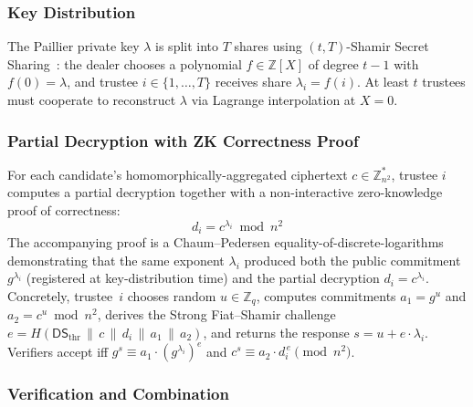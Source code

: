 \subsubsection{Key Distribution}
\label{subsubsec:threshold-dist}

The Paillier private key $\lambda$ is split into $T$ shares using $(t, T)$-Shamir Secret Sharing~\cite{shamir1979}: the dealer chooses a polynomial $f \in \mathbb{Z}[X]$ of degree $t-1$ with $f(0) = \lambda$, and trustee $i \in \{1, \ldots, T\}$ receives share $\lambda_i = f(i)$. At least $t$ trustees must cooperate to reconstruct $\lambda$ via Lagrange interpolation at $X = 0$.

\subsubsection{Partial Decryption with ZK Correctness Proof}
\label{subsubsec:threshold-partial}

For each candidate's homomorphically-aggregated ciphertext $c \in \mathbb{Z}_{n^2}^*$, trustee $i$ computes a partial decryption together with a non-interactive zero-knowledge proof of correctness:
\begin{equation}
    d_i = c^{\lambda_i} \bmod n^2
    \label{eq:partial-dec}
\end{equation}
The accompanying proof is a Chaum--Pedersen equality-of-discrete-logarithms~\cite{cramer1994or,schnorr1991} demonstrating that the same exponent $\lambda_i$ produced both the public commitment $g^{\lambda_i}$ (registered at key-distribution time) and the partial decryption $d_i = c^{\lambda_i}$. Concretely, trustee~$i$ chooses random $u \in \mathbb{Z}_q$, computes commitments $a_1 = g^u$ and $a_2 = c^u \bmod n^2$, derives the Strong Fiat--Shamir challenge $e = H(\mathsf{DS}_{\text{thr}} \,\|\, c \,\|\, d_i \,\|\, a_1 \,\|\, a_2)$, and returns the response $s = u + e \cdot \lambda_i$. Verifiers accept iff $g^s \equiv a_1 \cdot (g^{\lambda_i})^e$ and $c^s \equiv a_2 \cdot d_i^{\,e} \pmod{n^2}$.

\subsubsection{Verification and Combination}
\label{subsubsec:threshold-combine}

